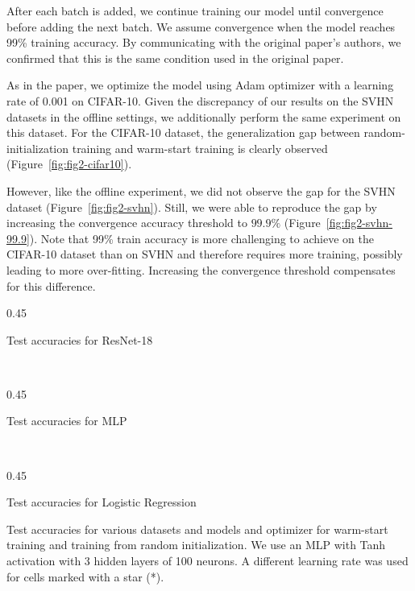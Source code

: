 After each batch is added, we continue training our model until convergence before adding the next batch. We assume convergence when the model reaches 99\% training accuracy. By communicating with the original paper's authors, we confirmed that this is the same condition used in the original paper.


%
%
%
%
%
%
%

%


As in the paper, we optimize the model using Adam optimizer with a learning rate of 0.001 on CIFAR-10. Given the discrepancy of our results on the SVHN datasets in the offline settings, we additionally perform the same experiment on this dataset. For the CIFAR-10 dataset, the generalization gap between random-initialization training and warm-start training is clearly observed (Figure~\ref{fig:fig2-cifar10}). 

However, like the offline experiment, we did not observe the gap for the SVHN dataset (Figure~\ref{fig:fig2-svhn}). Still, we were able to reproduce the gap by increasing the convergence accuracy threshold to $99.9\%$ (Figure~\ref{fig:fig2-svhn-99.9}). Note that 99\% train accuracy is more challenging to achieve on the CIFAR-10 dataset than on SVHN and therefore requires more training, possibly leading to more over-fitting. Increasing the convergence threshold compensates for this difference. 

\setlength{\intextsep}{5pt}%
\begin{wraptable}[42]{r}{0.45\textwidth}
\renewcommand{\arraystretch}{1.2}
\centering
\begin{subtable} {0.45\textwidth}

\vspace{5pt}
\caption{Test accuracies for ResNet-18}
\vspace{5pt}
\end{subtable}\\
\begin{subtable} {0.45\textwidth}

\vspace{5pt}
\caption{Test accuracies for MLP}
\end{subtable}\\
\begin{subtable} {0.45\textwidth}


\caption{Test accuracies for Logistic Regression}
\end{subtable}
\caption{Test accuracies for various datasets and models and optimizer for warm-start training and training from random initialization. We use an MLP with Tanh activation with 3 hidden layers of 100 neurons. A different learning rate was used for cells marked with a star (*). }
\label{tab:offline-warmup-vs-random}
\end{wraptable}


